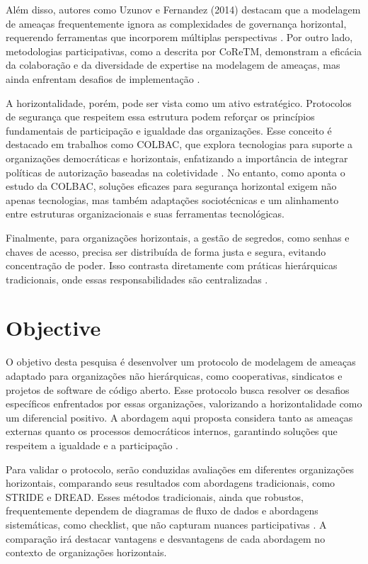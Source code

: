 Além disso, autores como Uzunov e Fernandez (2014) destacam que a modelagem de
ameaças frequentemente ignora as complexidades de governança horizontal,
requerendo ferramentas que incorporem múltiplas perspectivas
\cite{ThreatModelingASystematicLiteratureReview}. Por outro lado, metodologias
participativas, como a descrita por CoReTM, demonstram a eficácia da colaboração
e da diversidade de expertise na modelagem de ameaças, mas ainda enfrentam
desafios de implementação \cite{CoReTM}.

A horizontalidade, porém, pode ser vista como um ativo estratégico. Protocolos
de segurança que respeitem essa estrutura podem reforçar os princípios
fundamentais de participação e igualdade das organizações. Esse conceito é
destacado em trabalhos como COLBAC, que explora tecnologias para suporte a
organizações democráticas e horizontais, enfatizando a importância de integrar
políticas de autorização baseadas na coletividade \cite{Colbac}. No entanto,
como aponta o estudo da COLBAC, soluções eficazes para segurança horizontal
exigem não apenas tecnologias, mas também adaptações sociotécnicas e um
alinhamento entre estruturas organizacionais e suas ferramentas tecnológicas.

Finalmente, para organizações horizontais, a gestão de segredos, como senhas e
chaves de acesso, precisa ser distribuída de forma justa e segura, evitando
concentração de poder. Isso contrasta diretamente com práticas hierárquicas
tradicionais, onde essas responsabilidades são centralizadas \cite{Colbac}.

\section{Objective}
\label{sec:objective}

O objetivo desta pesquisa é desenvolver um protocolo de modelagem de ameaças
adaptado para organizações não hierárquicas, como cooperativas, sindicatos e
projetos de software de código aberto. Esse protocolo busca resolver os desafios
específicos enfrentados por essas organizações, valorizando a horizontalidade
como um diferencial positivo. A abordagem aqui proposta considera tanto as
ameaças externas quanto os processos democráticos internos, garantindo soluções
que respeitem a igualdade e a participação
\cite{ThreatModelingAsABasisForSecurityRequirements,
AHybridThreatModelingMethod, ParticipatoryThreatModelling}.

Para validar o protocolo, serão conduzidas avaliações em diferentes organizações
horizontais, comparando seus resultados com abordagens tradicionais, como STRIDE
e DREAD. Esses métodos tradicionais, ainda que robustos, frequentemente dependem
de diagramas de fluxo de dados e abordagens sistemáticas, como checklist, que
não capturam nuances participativas
\cite{ThreatModelingASystematicLiteratureReview,
ExperiencesThreatModelingAtMicrosoft}. A comparação irá destacar vantagens e
desvantagens de cada abordagem no contexto de organizações horizontais.

